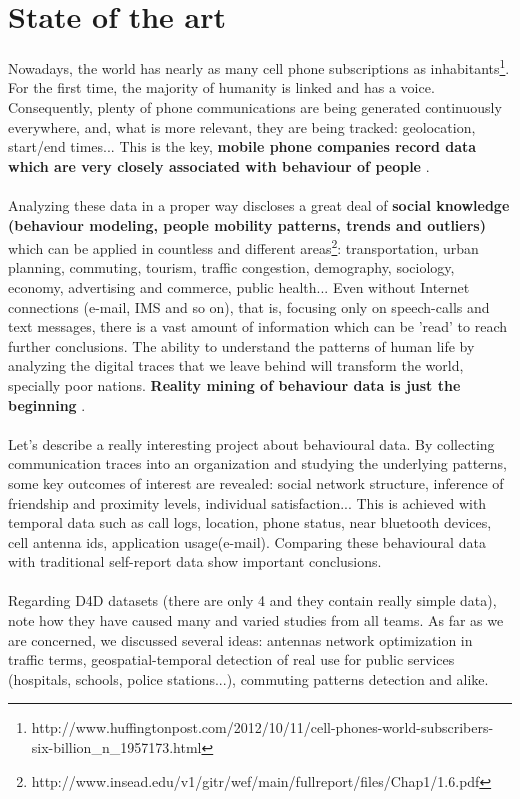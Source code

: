 \newpage

\section{State of the art}

Nowadays, the world has nearly as many cell phone subscriptions as inhabitants\footnote{http://www.huffingtonpost.com/2012/10/11/cell-phones-world-subscribers-six-billion\_n\_1957173.html}. For the first time, the majority of humanity is linked and has a voice. Consequently, plenty of phone communications are being generated continuously everywhere, and, what is more relevant, they are being tracked: geolocation, start/end times... This is the key, {\bf mobile phone companies record data which are very closely associated with behaviour of people }.
\\
\\
Analyzing these data in a proper way discloses a great deal of {\bf social knowledge (behaviour modeling, people mobility patterns, trends and outliers) } which can be applied in countless and different areas\footnote{http://www.insead.edu/v1/gitr/wef/main/fullreport/files/Chap1/1.6.pdf}: transportation, urban planning, commuting, tourism, traffic congestion, demography, sociology, economy, advertising and commerce, public health... Even without Internet connections (e-mail, IMS and so on), that is, focusing only on speech-calls and text messages, there is a vast amount of information which can be 'read' to reach further conclusions. The ability to understand the patterns of human life by analyzing the digital traces that we leave behind will transform the world, specially poor nations. {\bf Reality mining of behaviour data is just the beginning }.
\\
\\
Let's describe a really interesting project \citep{eage09} about behavioural data. By collecting communication traces into an organization and studying the underlying patterns, some key outcomes of interest are revealed: social network structure, inference of friendship and proximity levels, individual satisfaction... This is achieved with temporal data such as call logs, location, phone status, near bluetooth devices, cell antenna ids, application usage(e-mail). Comparing these behavioural data with traditional self-report data show important conclusions.
\\
\\
Regarding D4D datasets (there are only 4 and they contain really simple data), note how they have caused many and varied studies from all teams. As far as we are concerned, we discussed several ideas: antennas network optimization in traffic terms, geospatial-temporal detection of real use for public services (hospitals, schools, police stations...), commuting patterns detection and alike.
